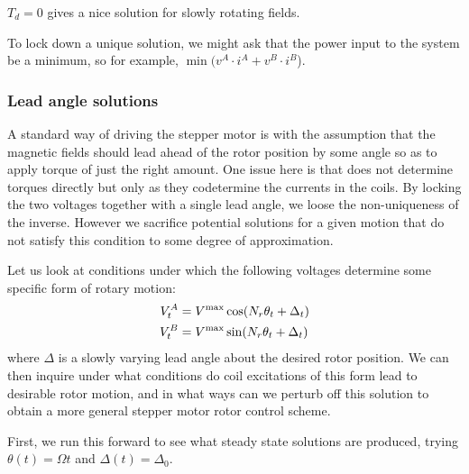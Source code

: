 \documentclass{article}
\begin{document}
\begin{appendix}
$T_d = 0$ gives a nice solution for slowly rotating fields. 

To lock down a unique solution, we might ask that the power input to the system be a minimum, so for example, $\min(v^A\cdot i^A + v^B\cdot i^B$). 

\subsubsection{Lead angle solutions}
A standard way of driving the stepper motor is with the assumption that the magnetic fields should lead ahead of the rotor position by some angle so as to apply torque of just the right amount. One issue here is that \vsol does not determine torques directly but only as they codetermine the currents in the coils.  By locking the two voltages together with a single lead angle, we loose the non-uniqueness of the inverse. However we sacrifice potential solutions for a given motion that do not satisfy this condition to some degree of approximation. 

Let us look at conditions under which the following voltages determine some specific form of rotary motion:
\begin{align}
V_t^A &= V^{\rm max} \cos(N_r \theta_t+\Delta_t)\\
V_t^B &= V^{\rm max} \sin(N_r \theta_t+\Delta_t)
\end{align}
where $\Delta$ is a slowly varying lead angle about the desired rotor position. We can then inquire under what conditions do coil excitations of this form lead to desirable rotor motion, and in what ways can we perturb off this solution to obtain a more general stepper motor rotor control scheme. 

First, we run this forward to see what steady state solutions are produced, trying $\theta(t) = \Omega t$ and $\Delta(t) = \Delta_0$. 


\end{appendix}
\end{document}
